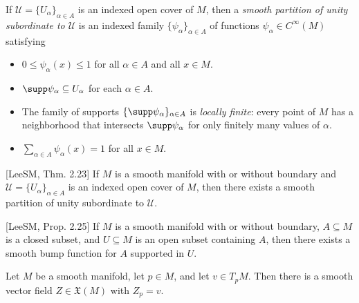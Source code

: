 If $\mathcal{U} = \{U_\alpha\}_{\alpha \in A}$ is an indexed open cover of $M$, then a \textit{smooth partition of
unity subordinate to $\mathcal{U}$} is an indexed family $\{\psi_\alpha\}_{\alpha \in A}$ of functions $\psi_\alpha \in C^{\infty}(M)$
satisfying
\begin{itemize}
  \item $0 \le \psi_\alpha(x) \le 1$ for all $\alpha \in A$ and all $x \in M$.
  \item $\supp \psi_\alpha \subseteq U_\alpha$ for each $\alpha \in A$.
  \item The family of supports $\{\supp \psi_\alpha\}_{\alpha \in A}$ is \textit{locally finite}: every point of $M$ has a
    neighborhood that intersects $\supp \psi_\alpha$ for only finitely many values of $\alpha$.
  \item $\sum_{\alpha \in A} \psi_\alpha(x) = 1$ for all $x \in M$.
\end{itemize}

\begin{proposition}
\label{prop:existence-partitions-unity}
[LeeSM, Thm. 2.23] If $M$ is a smooth manifold with or without boundary and $\mathcal{U} = \{U_\alpha\}_{\alpha \in A}$ is an indexed open cover of $M$, then there exists a smooth partition of unity subordinate to $\mathcal{U}$.
\end{proposition}

\begin{proposition}
\label{prop:existence-smooth-bump-functions}
[LeeSM, Prop. 2.25] If $M$ is a smooth manifold with or without boundary, $A \subseteq M$ is a closed subset, and $U \subseteq M$ is an open subset containing $A$, then there exists a smooth bump function for $A$ supported in $U$.
\end{proposition}

\begin{lemma}
\label{lem:vector-field-extension-point}





Let $M$ be a smooth manifold, let $p \in M$, and let $v \in T_pM$. Then there is a smooth vector field $Z \in \mathfrak{X}(M)$ with $Z_p = v$.
\end{lemma}

